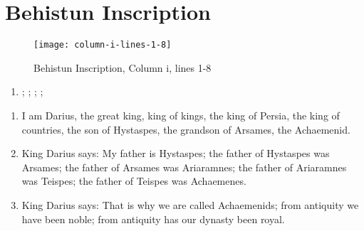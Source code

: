 \section{Behistun Inscription}

\begin{figure}[H]
    \texttt{[image: column-i-lines-1-8]}
    \caption{Behistun Inscription, Column i, lines 1-8\cite{BehistunT01}}
\end{figure}

\begin{enumerate}
    \item {\oldpersian ;} {\oldpersian ;}   {\oldpersian ;}  {\oldpersian ;}
\end{enumerate}

\begin{enumerate}
    \item I am Darius, the great king, king of kings, the king of Persia, the king of countries, the son of Hystaspes,
         the grandson of Arsames, the Achaemenid.
    \item King Darius says: My father is Hystaspes; the father of Hystaspes was Arsames; the father of Arsames was
          Ariaramnes; the father of Ariaramnes was Teispes; the father of Teispes was Achaemenes.
    \item King Darius says: That is why we are called Achaemenids; from antiquity we have been noble; from antiquity
          has our dynasty been royal.
\end{enumerate}
